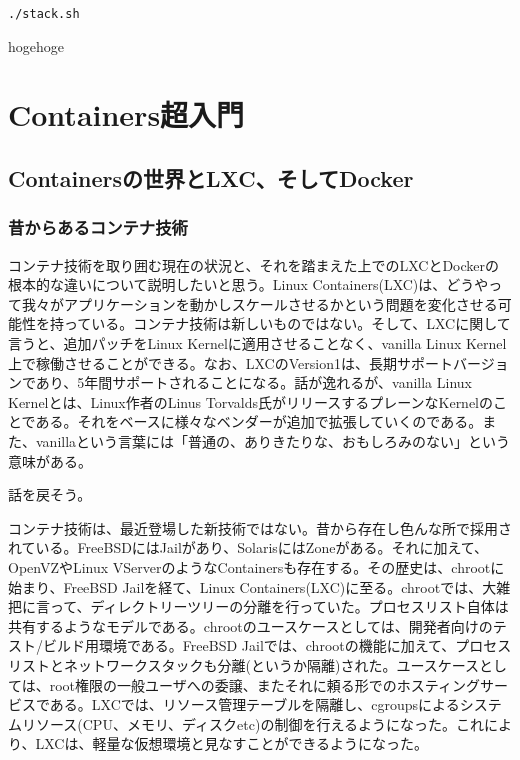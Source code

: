 \documentclass[9pt,b5paper,tombo]{jsbook}
\begin{document}
\begin{lstlisting}
./stack.sh
\end{lstlisting}

hogehoge

\chapter{Containers超入門}

\section{Containersの世界とLXC、そしてDocker}

\subsection{昔からあるコンテナ技術}
コンテナ技術を取り囲む現在の状況と、それを踏まえた上でのLXCとDockerの根本的な違いについて説明したいと思う。Linux Containers(LXC)は、どうやって我々がアプリケーションを動かしスケールさせるかという問題を変化させる可能性を持っている。コンテナ技術は新しいものではない。そして、LXCに関して言うと、追加パッチをLinux Kernelに適用させることなく、vanilla Linux Kernel上で稼働させることができる。なお、LXCのVersion1は、長期サポートバージョンであり、5年間サポートされることになる。話が逸れるが、vanilla Linux Kernelとは、Linux作者のLinus Torvalds氏がリリースするプレーンなKernelのことである。それをベースに様々なベンダーが追加で拡張していくのである。また、vanillaという言葉には「普通の、ありきたりな、おもしろみのない」という意味がある。

\noindent
話を戻そう。

コンテナ技術は、最近登場した新技術ではない。昔から存在し色んな所で採用されている。FreeBSDにはJailがあり、SolarisにはZoneがある。それに加えて、OpenVZやLinux VServerのようなContainersも存在する。その歴史は、chrootに始まり、FreeBSD Jailを経て、Linux Containers(LXC)に至る。chrootでは、大雑把に言って、ディレクトリーツリーの分離を行っていた。プロセスリスト自体は共有するようなモデルである。chrootのユースケースとしては、開発者向けのテスト/ビルド用環境である。FreeBSD Jailでは、chrootの機能に加えて、プロセスリストとネットワークスタックも分離(というか隔離)された。ユースケースとしては、root権限の一般ユーザへの委譲、またそれに頼る形でのホスティングサービスである。LXCでは、リソース管理テーブルを隔離し、cgroupsによるシステムリソース(CPU、メモリ、ディスクetc)の制御を行えるようになった。これにより、LXCは、軽量な仮想環境と見なすことができるようになった。
\end{document}
